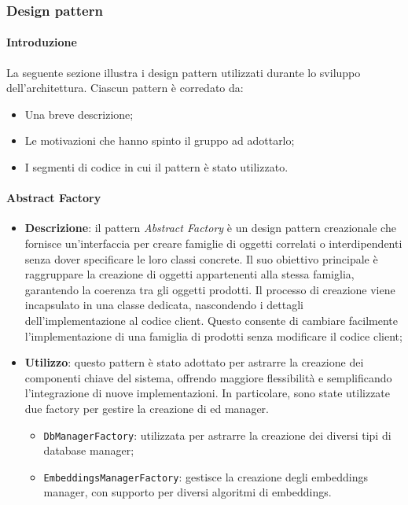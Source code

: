 \subsubsection{Design pattern}
\paragraph{Introduzione}
\par La seguente sezione illustra i design pattern utilizzati durante lo sviluppo dell'architettura. Ciascun pattern è corredato da:
\begin{itemize}
    \item Una breve descrizione;
    \item Le motivazioni che hanno spinto il gruppo ad adottarlo;
    \item I segmenti di codice in cui il pattern è stato utilizzato.
\end{itemize}

\paragraph{Abstract Factory}
\begin{itemize}
    \item \textbf{Descrizione}: il pattern \textit{Abstract Factory} è un design pattern creazionale che fornisce un'interfaccia per creare famiglie di oggetti correlati o interdipendenti senza dover specificare le loro classi concrete. Il suo obiettivo principale è raggruppare la creazione di oggetti appartenenti alla stessa famiglia, garantendo la coerenza tra gli oggetti prodotti. Il processo di creazione viene incapsulato in una classe dedicata, nascondendo i dettagli dell'implementazione al codice client. Questo consente di cambiare facilmente l'implementazione di una famiglia di prodotti senza modificare il codice client;
    \item \textbf{Utilizzo}: questo pattern è stato adottato per astrarre la creazione dei componenti chiave del sistema, offrendo maggiore flessibilità e semplificando l'integrazione di nuove implementazioni. In particolare, sono state utilizzate due factory per gestire la creazione di  ed  manager.
    \begin{itemize}
        \item \texttt{DbManagerFactory}: utilizzata per astrarre la creazione dei diversi tipi di database manager;
        \item \texttt{EmbeddingsManagerFactory}: gestisce la creazione degli embeddings manager, con supporto per diversi algoritmi di embeddings.
    \end{itemize}
\end{itemize}

